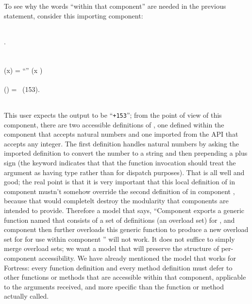 To see why the words ``within that component'' are needed in the previous statement,
consider this importing component:
\begin{codeexamplesize}
\begin{FortressCode}
  \\
 .\lbrace\,\,\rbrace \\
  \\
 \\
(x\COLON {}) = \hbox{\rm{}``\STR{+}''} \mathrel{\Vert} (x  ) \\
 \\
(\ultrathin) = \, (153). \\
 \\
 
\end{FortressCode}
\end{codeexamplesize}
This user expects the output to be ``{\tt +153}''; from the point of view of
this component, there are two accessible definitions of , one defined
within the component that accepts natural numbers and one imported from the
 API that accepts any integer.
The first definition handles natural numbers by asking the
imported definition to convert the number to a string and
then prepending a plus sign (the  keyword indicates that
that the function invocation  should treat the
argument as having type  rather than  for dispatch purposes).
That is all well and good; the real point is that it is very important
that this local definition of  in component 
mustn't somehow override the second definition of  in
component , because that would completelt
destroy the modularity that components are intended to provide.
Therefore a model that says,
``Component  exports a generic function named 
that consists of a set of definitions (an overload set) for , and component
 then further overloads this generic function to
produce a new overload set for  for use within component '' will not work.
It does not suffice to simply merge overload sets;
we want a model that will preserve the structure of per-component accessibility.
We have already mentioned the model that works for Fortress:
every function definition and every method definition must
defer to other functions or methods that are accessible within that component,
applicable to the arguments received,
and more specific than the function or method actually called.

